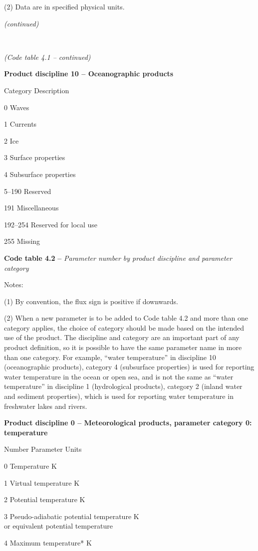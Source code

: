 (2) Data are in specified physical units.

\emph{(continued)}

\textbf{\\
}

\emph{(Code table 4.1 -- continued)}

\textbf{Product discipline 10 -- Oceanographic products}

Category Description

0 Waves

1 Currents

2 Ice

3 Surface properties

4 Subsurface properties

5--190 Reserved

191 Miscellaneous

192--254 Reserved for local use

255 Missing

\textbf{Code table 4.2} \textbf{--} \emph{Parameter number by product discipline and parameter category}

Notes:

(1) By convention, the flux sign is positive if downwards.

(2) When a new parameter is to be added to Code table 4.2 and more than one category applies, the choice of category should be made based on the intended use of the product. The discipline and category are an important part of any product definition, so it is possible to have the same parameter name in more than one category. For example, ``water temperature'' in discipline 10 (oceanographic products), category 4 (subsurface properties) is used for reporting water temperature in the ocean or open sea, and is not the same as ``water temperature'' in discipline 1 (hydrological products), category 2 (inland water and sediment properties), which is used for reporting water temperature in freshwater lakes and rivers.

\textbf{Product discipline 0 -- Meteorological products, parameter category 0: temperature}

Number Parameter Units

0 Temperature K

1 Virtual temperature K

2 Potential temperature K

3 Pseudo-adiabatic potential temperature K\\
or equivalent potential temperature

4 Maximum temperature* K

